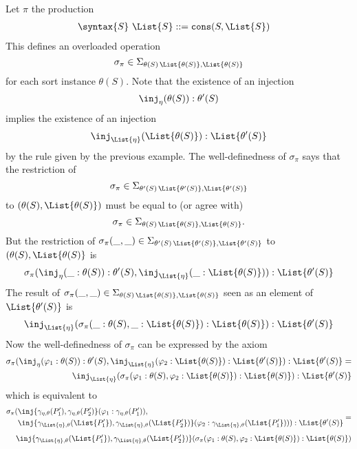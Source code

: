 \documentclass{article}
\theoremstyle{definition}
\theoremstyle{definition}
\theoremstyle{definition}
\theoremstyle{definition}
\theoremstyle{definition}
\theoremstyle{theorem}
\theoremstyle{theorem}
\theoremstyle{theorem}
\theoremstyle{theorem}
\theoremstyle{theorem}
\begin{document}
\begin{enumerate}[label=(\arabic*)]
{Let $\pi$ the production
\begin{align*}
&\syntax\{S\}\ \List{S}::=\texttt{cons}(S,\List{S})
\end{align*}
This defines an overloaded operation 
\[\sigma_\pi\in\Sigma_{\theta(S)\,\List{\theta(S)},\List{\theta(S)}}\]
for each sort instance $\theta(S)$. 
Note that 
the existence of an injection 
\[\inj_{\eta}(\theta(S)):\theta'(S)\] 
implies the existence of an injection
\[\inj_{\List{\eta}}(\List{\theta(S)}):\List{\theta'(S)}\] 
by the rule given by the previous example.  The well-definedness of $\sigma_\pi$ says that the restriction of 
\[\sigma_\pi\in\Sigma_{\theta'(S)\,\List{\theta'(S)},\List{\theta'(S)}}\] 
to $(\theta(S),\List{\theta(S)})$ must be equal to (or agree with)  
\[\sigma_\pi\in\Sigma_{\theta(S)\,\List{\theta(S)},\List{\theta(S)}}.\]
But the restriction of $\sigma_\pi(\_,\_)\in\Sigma_{\theta'(S)\,\List{\theta'(S)},\List{\theta'(S)}}$ to $(\theta(S),\List{\theta(S)}$ is
\[
\sigma_\pi(\inj_{\eta}(\_:\theta(S)):\theta'(S), \inj_{\List{\eta}}(\_:\List{\theta(S)})):\List{\theta'(S)}
\]
The result of $\sigma_\pi(\_,\_)\in\Sigma_{\theta(S)\,\List{\theta(S)},\List{\theta(S)}}$ seen as an element of $\List{\theta'(S)}$ is 
\[
\inj_{\List{\eta}}(\sigma_\pi(\_:\theta(S),\_:\List{\theta(S)}):\List{\theta(S)}):\List{\theta'(S)}
\]
Now the well-definedness of $\sigma_\pi$ can be expressed by the axiom
\[
\begin{split}
\sigma_\pi(\inj_{\eta}(\varphi_1:\theta(S)):\theta'(S), \inj_{\List{\eta}}(\varphi_2:\List{\theta(S)}):\List{\theta'(S)}):\List{\theta'(S)}=\\
\inj_{\List{\eta}}(\sigma_\pi(\varphi_1:\theta(S),\varphi_2:\List{\theta(S)}):\List{\theta(S)}):\List{\theta'(S)}
\end{split}
\]
which is equivalent to 
\[
\begin{split}
\begin{aligned}
\sigma_\pi(&\inj\{\gamma_{\eta,\theta}(P'_1),\gamma_{\eta,\theta}(P'_2)\}(\varphi_1:\gamma_{\eta,\theta}(P'_1)), \\
&\inj\{\gamma_{\List{\eta},\theta}(\List{P'_1}),\gamma_{\List{\eta},\theta}(\List{P'_2})\}(\varphi_2:\gamma_{\List{\eta},\theta}(\List{P'_1}))):\List{\theta'(S)}
\end{aligned}=\\[1ex]
\inj\{\gamma_{\List{\eta},\theta}(\List{P'_1}),\gamma_{\List{\eta},\theta}(\List{P'_2})\}(\sigma_\pi(\varphi_1:\theta(S),\varphi_2:\List{\theta(S)}):\List{\theta(S)})

\end{split}\]}
\end{enumerate}
\end{document}
